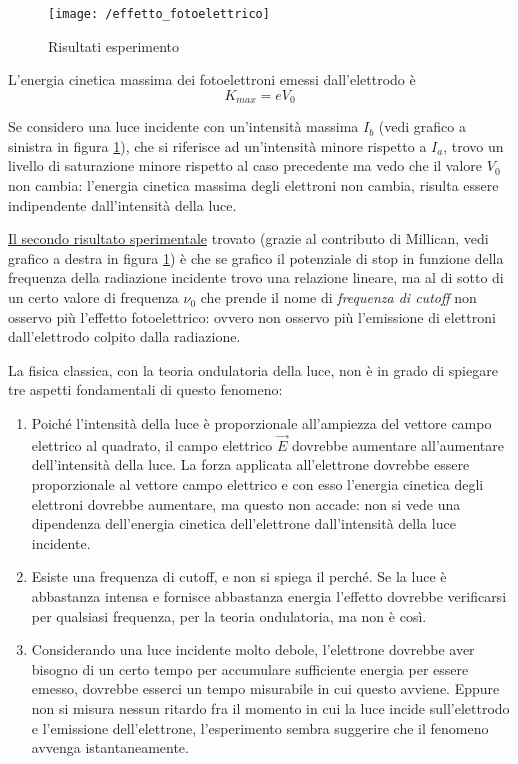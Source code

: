 \begin{figure}[h]
\centering
\texttt{[image: /effetto\_fotoelettrico]}
\caption{Risultati esperimento}
\label{risultati_Lenard}
\end{figure}

L'energia cinetica massima dei fotoelettroni emessi dall'elettrodo è
\begin{equation}
K_{max} = e V_0
\end{equation}

Se considero una luce incidente con un'intensità massima $I_b$ (vedi grafico a sinistra in figura \ref{risultati_Lenard}), che si riferisce ad un'intensità minore rispetto a $I_a$, trovo un livello di saturazione minore rispetto al caso precedente ma vedo che il valore $V_0$ non cambia: l'energia cinetica massima degli elettroni non cambia, risulta essere indipendente dall'intensità della luce.

\underline{Il secondo risultato sperimentale} trovato (grazie al contributo di Millican, vedi grafico a destra in figura \ref{risultati_Lenard}) è che se grafico il potenziale di stop in funzione della frequenza della radiazione incidente trovo una relazione lineare, ma al di sotto di un certo valore di frequenza $\nu_0$ che prende il nome di \textit{frequenza di cutoff} non osservo più l'effetto fotoelettrico: ovvero non osservo più l'emissione di elettroni dall'elettrodo colpito dalla radiazione.




La fisica classica, con la teoria ondulatoria della luce, non è in grado di spiegare tre aspetti fondamentali di questo fenomeno:
\begin{enumerate}[label=\Roman{*}]
\item Poiché l'intensità della luce è proporzionale all'ampiezza del vettore campo elettrico al quadrato, il campo elettrico $\vec E$ dovrebbe aumentare all'aumentare dell'intensità della luce.
La forza applicata all'elettrone dovrebbe essere proporzionale al vettore campo elettrico e con esso l'energia cinetica degli elettroni dovrebbe aumentare, ma questo non accade: non si vede una dipendenza dell'energia cinetica dell'elettrone dall'intensità della luce incidente.

\item Esiste una frequenza di cutoff, e non si spiega il perché. Se la luce è abbastanza intensa e fornisce abbastanza energia l'effetto dovrebbe verificarsi per qualsiasi frequenza, per la teoria ondulatoria, ma non è così. 

\item Considerando una luce incidente molto debole, l'elettrone dovrebbe aver bisogno di un certo tempo per accumulare sufficiente energia per essere emesso, dovrebbe esserci un tempo misurabile in cui questo avviene.
Eppure non si misura nessun ritardo fra il momento in cui la luce incide sull'elettrodo e l'emissione dell'elettrone, l'esperimento sembra suggerire che il fenomeno avvenga istantaneamente.
\end{enumerate}

